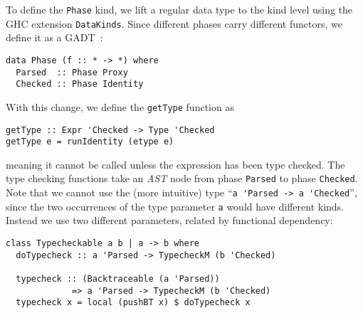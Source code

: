 \documentclass[sigplan,screen]{acmart}
\makeatletter
\newcommand{\ec}[1]{\lstinline[style=encore,breaklines=true,basicstyle=\fontsize{9}{9}\tt]@#1@}
\newcommand{\astt}[0]{\textit{AST}}
\makeatother
\begin{document}
To define the \ec{Phase} kind, we lift a regular data type to the
kind level using the GHC extension \ec{DataKinds}. Since different
phases carry different functors, we define it as a
GADT~\cite{gadts-inference}:

\begin{minipage}[t]{.55\linewidth}
\begin{lstlisting}[style=encore]
data Phase (f :: * -> *) where
  Parsed  :: Phase Proxy
  Checked :: Phase Identity
\end{lstlisting}
\end{minipage}

With this change, we define the \ec{getType} function as

\begin{minipage}[t]{.8\linewidth}
\begin{lstlisting}[style=encore]
getType :: Expr 'Checked -> Type 'Checked
getType e = runIdentity (etype e)
\end{lstlisting}
\end{minipage}

\noindent
meaning it cannot be called unless the expression has been type
checked. The type checking functions take an \astt{} node from
phase \ec{Parsed} to phase \ec{Checked}. Note that we cannot use
the (more intuitive) type ``\ec{a 'Parsed -> a 'Checked}'', since
the two occurrences of the type parameter \ec{a} would have different kinds. Instead
we use two different parameters, related by functional dependency:

\begin{minipage}[t]{\linewidth}
\begin{lstlisting}[style=encore]
class Typecheckable a b | a -> b where
  doTypecheck :: a 'Parsed -> TypecheckM (b 'Checked)

  typecheck :: (Backtraceable (a 'Parsed))
             => a 'Parsed -> TypecheckM (b 'Checked)
  typecheck x = local (pushBT x) $ doTypecheck x
\end{lstlisting}
\end{minipage}

\end{document}
